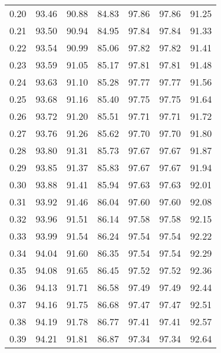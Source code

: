 \begin{tabular}{|c|c|c|c|c|c|c|}
      0.20 &     93.46 &     90.88 &      84.83 &   97.86 &      97.86 &         91.25 \\
      0.21 &     93.50 &     90.94 &      84.95 &   97.84 &      97.84 &         91.33 \\
      0.22 &     93.54 &     90.99 &      85.06 &   97.82 &      97.82 &         91.41 \\
      0.23 &     93.59 &     91.05 &      85.17 &   97.81 &      97.81 &         91.48 \\
      0.24 &     93.63 &     91.10 &      85.28 &   97.77 &      97.77 &         91.56 \\
      0.25 &     93.68 &     91.16 &      85.40 &   97.75 &      97.75 &         91.64 \\
      0.26 &     93.72 &     91.20 &      85.51 &   97.71 &      97.71 &         91.72 \\
      0.27 &     93.76 &     91.26 &      85.62 &   97.70 &      97.70 &         91.80 \\
      0.28 &     93.80 &     91.31 &      85.73 &   97.67 &      97.67 &         91.87 \\
      0.29 &     93.85 &     91.37 &      85.83 &   97.67 &      97.67 &         91.94 \\
      0.30 &     93.88 &     91.41 &      85.94 &   97.63 &      97.63 &         92.01 \\
      0.31 &     93.92 &     91.46 &      86.04 &   97.60 &      97.60 &         92.08 \\
      0.32 &     93.96 &     91.51 &      86.14 &   97.58 &      97.58 &         92.15 \\
      0.33 &     93.99 &     91.54 &      86.24 &   97.54 &      97.54 &         92.22 \\
      0.34 &     94.04 &     91.60 &      86.35 &   97.54 &      97.54 &         92.29 \\
      0.35 &     94.08 &     91.65 &      86.45 &   97.52 &      97.52 &         92.36 \\
      0.36 &     94.13 &     91.71 &      86.58 &   97.49 &      97.49 &         92.44 \\
      0.37 &     94.16 &     91.75 &      86.68 &   97.47 &      97.47 &         92.51 \\
      0.38 &     94.19 &     91.78 &      86.77 &   97.41 &      97.41 &         92.57 \\
      0.39 &     94.21 &     91.81 &      86.87 &   97.34 &      97.34 &         92.64 \\

\end{tabular}
